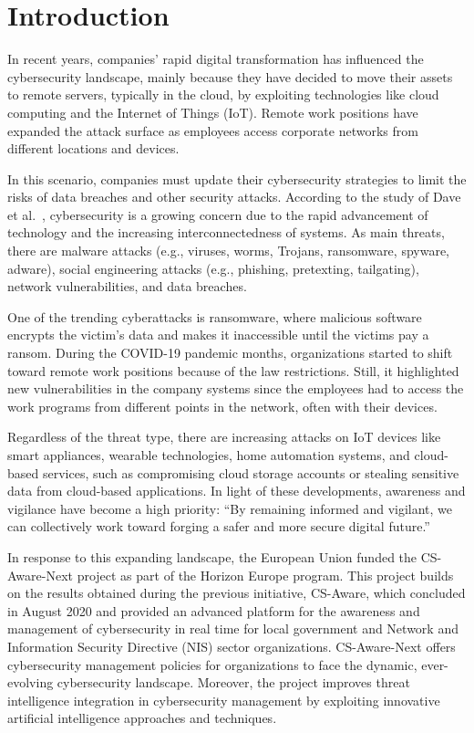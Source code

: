 \chapter*{Introduction}\label{ch:introduction}
In recent years, companies' rapid digital transformation has influenced the cybersecurity landscape, mainly because they have decided to move their assets to remote servers, typically in the cloud, by exploiting technologies like cloud computing and the Internet of Things (IoT). Remote work positions have expanded the attack surface as employees access corporate networks from different locations and devices.

In this scenario, companies must update their cybersecurity strategies to limit the risks of data breaches and other security attacks. According to the study of Dave et al.~\cite{dave2023}, cybersecurity is a growing concern due to the rapid advancement of technology and the increasing interconnectedness of systems. As main threats, there are malware attacks (e.g., viruses, worms, Trojans, ransomware, spyware, adware), social engineering attacks (e.g., phishing, pretexting, tailgating), network vulnerabilities, and data breaches.

One of the trending cyberattacks is ransomware, where malicious software encrypts the victim's data and makes it inaccessible until the victims pay a ransom. During the COVID-19 pandemic months, organizations started to shift toward remote work positions because of the law restrictions. Still, it highlighted new vulnerabilities in the company systems since the employees had to access the work programs from different points in the network, often with their devices.

Regardless of the threat type, there are increasing attacks on IoT devices like smart appliances, wearable technologies, home automation systems, and cloud-based services, such as compromising cloud storage accounts or stealing sensitive data from cloud-based applications. In light of these developments, awareness and vigilance have become a high priority: ``By remaining informed and vigilant, we can collectively work toward forging a safer and more secure digital future.''~\cite{dave2023}

In response to this expanding landscape, the European Union funded the CS-Aware-Next project as part of the Horizon Europe program. This project builds on the results obtained during the previous initiative, CS-Aware, which concluded in August 2020 and provided an advanced platform for the awareness and management of cybersecurity in real time for local government and Network and Information Security Directive (NIS) sector organizations. CS-Aware-Next offers cybersecurity management policies for organizations to face the dynamic, ever-evolving cybersecurity landscape. Moreover, the project improves threat intelligence integration in cybersecurity management by exploiting innovative artificial intelligence approaches and techniques.

